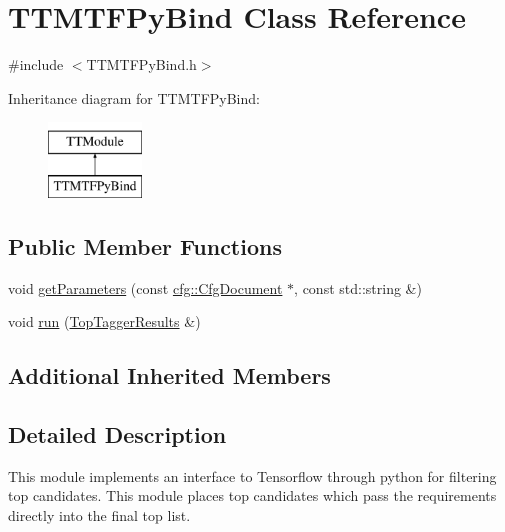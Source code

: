 \hypertarget{classTTMTFPyBind}{\section{T\-T\-M\-T\-F\-Py\-Bind Class Reference}
\label{classTTMTFPyBind}
}


{\ttfamily \#include $<$T\-T\-M\-T\-F\-Py\-Bind.\-h$>$}

Inheritance diagram for T\-T\-M\-T\-F\-Py\-Bind\-:\begin{figure}[H]
\begin{center}
\leavevmode
\includegraphics[height=2.000000cm]{classTTMTFPyBind}
\end{center}
\end{figure}
\subsection*{Public Member Functions}
\begin{DoxyCompactItemize}
\item 
void \hyperlink{classTTMTFPyBind_a3c9f2ca6bc095df3bad89c531cd45544}{get\-Parameters} (const \hyperlink{classcfg_1_1CfgDocument}{cfg\-::\-Cfg\-Document} $\ast$, const std\-::string \&)
\item 
void \hyperlink{classTTMTFPyBind_a5815a77655f5500c117cf71269105242}{run} (\hyperlink{classTopTaggerResults}{Top\-Tagger\-Results} \&)
\end{DoxyCompactItemize}
\subsection*{Additional Inherited Members}


\subsection{Detailed Description}
This module implements an interface to Tensorflow through python for filtering top candidates. This module places top candidates which pass the requirements directly into the final top list.


